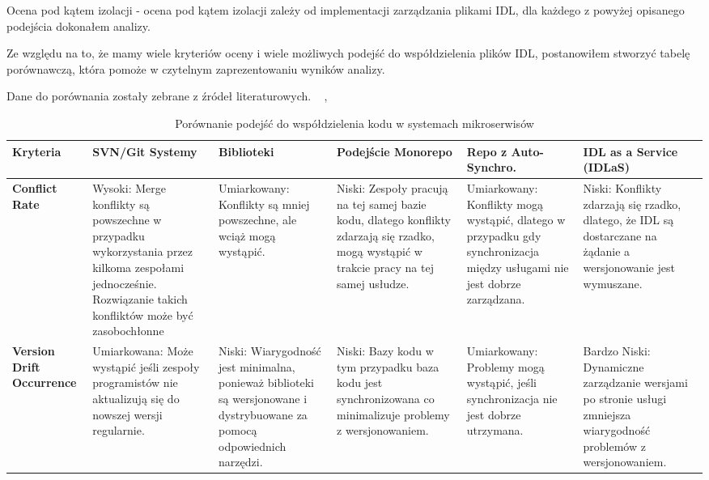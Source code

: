 \documentclass[runningheads,12pt]{llncs}
\begin{document}
Ocena pod kątem izolacji - ocena pod kątem izolacji zależy od implementacji zarządzania plikami IDL, dla każdego z powyżej opisanego podejścia dokonałem analizy.

Ze względu na to, że mamy wiele kryteriów oceny i wiele możliwych podejść do współdzielenia plików IDL, postanowiłem stworzyć tabelę porównawczą, która pomoże w czytelnym zaprezentowaniu wyników analizy.

Dane do porównania zostały zebrane z źródeł literaturowych. ~\cite{newman2015building} ,  ~\cite{kleppmann2017designing}
\begin{table}[htbp]
    \centering
    \caption{Porównanie podejść do współdzielenia kodu w systemach mikroserwisów}
    \label{tab:comparison}
    \begin{tabularx}{\textwidth}{|>{\raggedright\arraybackslash}X|>{\raggedright\arraybackslash}X|>{\raggedright\arraybackslash}X|>{\raggedright\arraybackslash}X|>{\raggedright\arraybackslash}X|>{\raggedright\arraybackslash}X|}
    \hline
    \textbf{Kryteria} & \textbf{SVN/Git Systemy} & \textbf{Biblioteki} & \textbf{Podejście Monorepo} & \textbf{Repo z Auto-Synchro.} & \textbf{IDL as a Service (IDLaS)} \\
    \hline
    \textbf{Conflict Rate} &
    Wysoki: Merge konflikty są powszechne w przypadku wykorzystania przez kilkoma zespołami jednocześnie. Rozwiązanie takich konfliktów może być zasobochłonne &
    Umiarkowany: Konflikty są mniej powszechne, ale wciąż mogą wystąpić. &
    Niski: Zespoły pracują na tej samej bazie kodu, dlatego konflikty zdarzają się rzadko, mogą wystąpić w trakcie pracy na tej samej usłudze. &
    Umiarkowany: Konflikty mogą wystąpić, dlatego w przypadku gdy synchronizacja między usługami nie jest dobrze zarządzana. &
    Niski: Konflikty zdarzają się rzadko, dlatego, że IDL są dostarczane na żądanie a wersjonowanie jest wymuszane. \\
    \hline
    \textbf{Version Drift Occurrence} &
    Umiarkowana: Może wystąpić jeśli zespoły programistów nie aktualizują się do nowszej wersji regularnie. &
    Niski: Wiarygodność jest minimalna, ponieważ biblioteki są wersjonowane i dystrybuowane za pomocą odpowiednich narzędzi. &
    Niski: Bazy kodu w tym przypadku baza kodu jest synchronizowana co minimalizuje problemy z wersjonowaniem. &
    Umiarkowany: Problemy mogą wystąpić, jeśli synchronizacja nie jest dobrze utrzymana. &
    Bardzo Niski: Dynamiczne zarządzanie wersjami po stronie usługi zmniejsza wiarygodność problemów z wersjonowaniem. \\

\end{tabularx}
\end{table}
\end{document}
